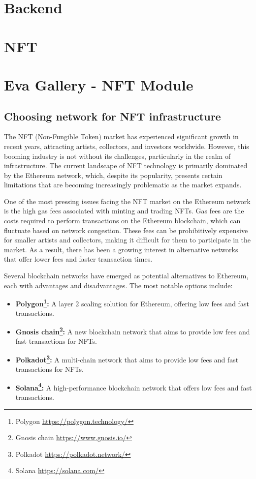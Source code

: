\section{Backend}

\section{NFT}

\section{Eva Gallery - NFT Module}
\subsection{Choosing network for NFT infrastructure}
The NFT (Non-Fungible Token) market has experienced significant growth in recent years, attracting artists, collectors, and investors worldwide. However, this booming industry is not without its challenges, particularly in the realm of infrastructure. The current landscape of NFT technology is primarily dominated by the Ethereum network, which, despite its popularity, presents certain limitations that are becoming increasingly problematic as the market expands.

One of the most pressing issues facing the NFT market on the Ethereum network is the high gas fees associated with minting and trading NFTs. Gas fees are the costs required to perform transactions on the Ethereum blockchain, which can fluctuate based on network congestion. These fees can be prohibitively expensive for smaller artists and collectors, making it difficult for them to participate in the market. As a result, there has been a growing interest in alternative networks that offer lower fees and faster transaction times.

Several blockchain networks have emerged as potential alternatives to Ethereum, each with advantages and disadvantages. The most notable options include:

\begin{itemize}
    \item \textbf{Polygon\footnote{Polygon \url{https://polygon.technology/}}:} A layer 2 scaling solution for Ethereum, offering low fees and fast transactions.
    \item \textbf{Gnosis chain\footnote{Gnosis chain \url{https://www.gnosis.io/}}:} A new blockchain network that aims to provide low fees and fast transactions for NFTs.
    \item \textbf{Polkadot\footnote{Polkadot \url{https://polkadot.network/}}:} A multi-chain network that aims to provide low fees and fast transactions for NFTs.
    \item \textbf{Solana\footnote{Solana \url{https://solana.com/}}:} A high-performance blockchain network that offers low fees and fast transactions.
\end{itemize}

